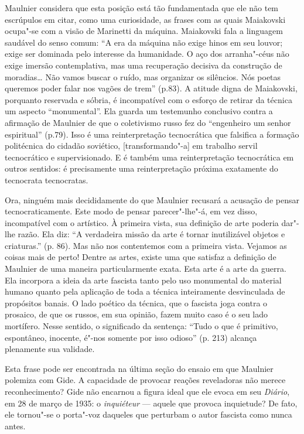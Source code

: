 Maulnier considera que esta posição está tão fundamentada que ele não
tem escrúpulos em citar, como uma curiosidade, as frases com as quais
Maiakovski ocupa"-se com a visão de Marinetti da máquina. Maiakovski fala
a linguagem saudável do senso comum: ``A era da máquina não exige hinos
em seu louvor; exige ser dominada pelo interesse da humanidade. O aço
dos arranha"-céus não exige imersão contemplativa, mas uma recuperação
decisiva da construção de moradias\ldots{} Não vamos buscar o ruído, mas
organizar os silêncios. Nós poetas queremos poder falar nos vagões de
trem'' (p.83). A atitude digna de Maiakovski, porquanto reservada e
sóbria, é incompatível com o esforço de retirar da técnica um aspecto
``monumental''. Ela guarda um testemunho conclusivo contra a afirmação
de Maulnier de que o coletivismo russo fez do ``engenheiro um senhor
espiritual'' (p.79). Isso é uma reinterpretação tecnocrática que
falsifica a formação politécnica do cidadão soviético,
{[}transformando"-a{]} em trabalho servil tecnocrático e supervisionado.
E é também uma reinterpretação tecnocrática em outros sentidos: é
precisamente uma reinterpretação próxima exatamente do tecnocrata
tecnocratas.

Ora, ninguém mais decididamente do que Maulnier recusará a acusação de
pensar tecnocraticamente. Este modo de pensar parecer"-lhe"-á, em vez
disso, incompatível com o artístico. À primeira vista, sua definição de
arte poderia dar"-lhe razão. Ela diz: ``A verdadeira missão da arte é
tornar inutilizável objetos e criaturas.'' (p. 86). Mas não nos
contentemos com a primeira vista. Vejamos as coisas mais de perto!
Dentre as artes, existe uma que satisfaz a definição de Maulnier de uma
maneira particularmente exata. Esta arte é a arte da guerra. Ela
incorpora a ideia da arte fascista tanto pelo uso monumental do material
humano quanto pela aplicação de toda a técnica inteiramente desvinculada
de propósitos banais. O lado poético da técnica, que o fascista joga
contra o prosaico, de que os russos, em sua opinião, fazem muito caso é
o seu lado mortífero. Nesse sentido, o significado da sentença: ``Tudo o
que é primitivo, espontâneo, inocente, é"-nos somente por isso odioso''
(p. 213) alcança plenamente sua validade.

Esta frase pode ser encontrada na última seção do ensaio em que Maulnier
polemiza com Gide. A capacidade de provocar reações reveladoras não
merece reconhecimento? Gide não encarnou a figura ideal que ele evoca em
seu \emph{Diário}, em 28 de março de 1935: o \emph{inquiéteur} --- aquele
que provoca inquietude? De fato, ele tornou"-se o porta"-voz daqueles que
perturbam o autor fascista como nunca antes.


